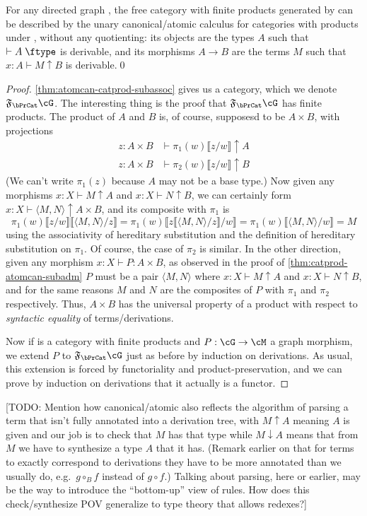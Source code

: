 \documentclass{book}
\let\types\vdash
\def\type{\;\ftype}
\newcommand{\atom}{\mathrel{\downarrow}}
\newcommand{\can}{\mathrel{\uparrow}}
\newcommand{\hsub}[1]{\llbracket #1\rrbracket}
\newcommand{\F}[1]{\mathfrak{F}_{#1}}
\def\pair#1#2{\langle #1,#2\rangle}
\begin{document}
\begin{thm}\label{thm:atomcan-catprod-initial}
  For any directed graph \cG, the free category with finite products generated by \cG can be described by the unary canonical/atomic calculus for categories with products under \cG, without any quotienting: its objects are the types $A$ such that $\types A\type$ is derivable, and its morphisms $A\to B$ are the terms $M$ such that $x:A \types M\can B$ is derivable.\qed
\end{thm}
\begin{proof}
  \cref{thm:atomcan-catprod-subassoc} gives us a category, which we denote $\F\bPrCat\cG$.
  The interesting thing is the proof that $\F\bPrCat\cG$ has finite products.
  The product of $A$ and $B$ is, of course, supposesd to be $A\times B$, with projections
  \begin{align*}
    z:A\times B &\types \pi_1(w)\hsub{z/w}\can A\\
    z:A\times B &\types \pi_2(w)\hsub{z/w}\can B
  \end{align*}
  (We can't write $\pi_1(z)$ because $A$ may not be a base type.)
  Now given any morphisms $x:X \types M\can A$ and $x:X \types N\can B$, we can certainly form $x:X \types \pair M N \can A\times B$, and its composite with $\pi_1$ is
  \[ \pi_1(w)\hsub{z/w}\hsub{\pair M N/z} = \pi_1(w)\hsub{z\hsub{\pair M N/z}/w} = \pi_1(w)\hsub{\pair M N/w} = M \]
  using the associativity of hereditary substitution and the definition of hereditary substitution on $\pi_1$.
  Of course, the case of $\pi_2$ is similar.
  In the other direction, given any morphism $x:X \types P:A\times B$, as observed in the proof of \cref{thm:catprod-atomcan-subadm} $P$ must be a pair $\pair M N$ where $x:X\types M\can A$ and $x:X\types N\can B$, and for the same reasons $M$ and $N$ are the composites of $P$ with $\pi_1$ and $\pi_2$ respectively.
  Thus, $A\times B$ has the universal property of a product with respect to \emph{syntactic equality} of terms/derivations.

  Now if \cM is a category with finite products and $P:\cG\to\cM$ a graph morphism, we extend $P$ to $\F\bPrCat\cG$ just as before by induction on derivations.
  As usual, this extension is forced by functoriality and product-preservation, and we can prove by induction on derivations that it actually is a functor.
\end{proof}

[TODO: Mention how canonical/atomic also reflects the algorithm of parsing a term that isn't fully annotated into a derivation tree, with $M\can A$ meaning $A$ is given and our job is to check that $M$ has that type while $M\atom A$ means that from $M$ we have to synthesize a type $A$ that it has.  (Remark earlier on that for terms to exactly correspond to derivations they have to be more annotated than we usually do, e.g.\ $g\circ_B f$ instead of $g\circ f$.)  Talking about parsing, here or earlier, may be the way to introduce the ``bottom-up'' view of rules.  How does this check/synthesize POV generalize to type theory that allows redexes?]
\end{document}
